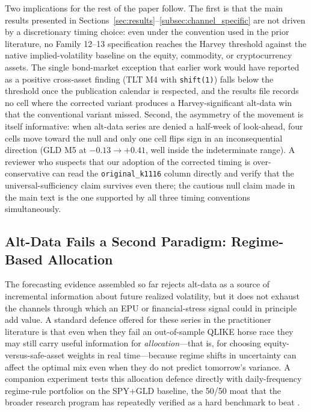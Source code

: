 \documentclass[12pt,a4paper]{article}
\begin{document}
Two implications for the rest of the paper follow. The first is that the main results presented in Sections~\ref{sec:results}--\ref{subsec:channel_specific} are not driven by a discretionary timing choice: even under the convention used in the prior literature, no Family 12--13 specification reaches the Harvey threshold against the native implied-volatility baseline on the equity, commodity, or cryptocurrency assets. The single bond-market exception that earlier work would have reported as a positive cross-asset finding (TLT M4 with \texttt{shift(1)}) falls below the threshold once the publication calendar is respected, and the results file records no cell where the corrected variant produces a Harvey-significant alt-data win that the conventional variant missed. Second, the asymmetry of the movement is itself informative: when alt-data series are denied a half-week of look-ahead, four cells move toward the null and only one cell flips sign in an inconsequential direction (GLD M5 at $-0.13 \to +0.41$, well inside the indeterminate range). A reviewer who suspects that our adoption of the corrected timing is over-conservative can read the \texttt{original\_k1116} column directly and verify that the universal-sufficiency claim survives even there; the cautious null claim made in the main text is the one supported by all three timing conventions simultaneously.


\subsection{Alt-Data Fails a Second Paradigm: Regime-Based Allocation}
\label{subsec:k1121_allocation}


The forecasting evidence assembled so far rejects alt-data as a source of incremental information about future realized volatility, but it does not exhaust the channels through which an EPU or financial-stress signal could in principle add value. A standard defence offered for these series in the practitioner literature is that even when they fail an out-of-sample QLIKE horse race they may still carry useful information for \emph{allocation}---that is, for choosing equity-versus-safe-asset weights in real time---because regime shifts in uncertainty can affect the optimal mix even when they do not predict tomorrow's variance. A companion experiment tests this allocation defence directly with daily-frequency regime-rule portfolios on the SPY+GLD baseline, the 50/50 moat that the broader research program has repeatedly verified as a hard benchmark to beat \citep{demiguel2009}.
\end{document}
